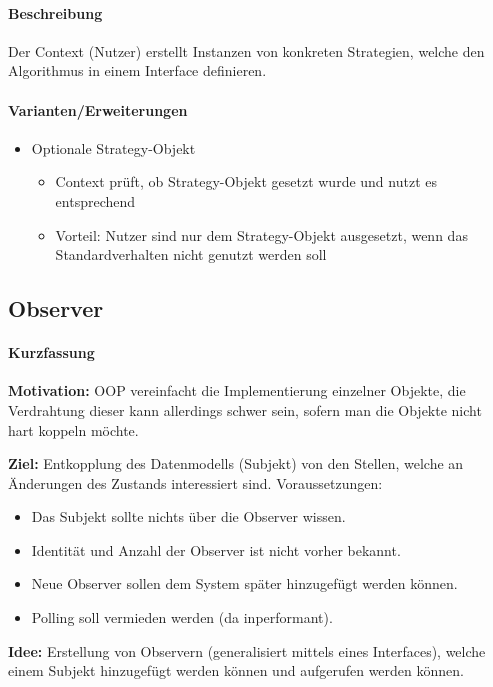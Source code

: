 \documentclass[a4paper, 11pt, accentcolor = tud3b]{tudreport}
\begin{document}
				\paragraph{Beschreibung}
					Der Context (Nutzer) erstellt Instanzen von konkreten Strategien, welche den Algorithmus in einem Interface definieren.
				
				\paragraph{Varianten/Erweiterungen}
					\begin{itemize}
						\item Optionale Strategy-Objekt
							\begin{itemize}
								\item Context prüft, ob Strategy-Objekt gesetzt wurde und nutzt es entsprechend
								\item Vorteil: Nutzer sind nur dem Strategy-Objekt ausgesetzt, wenn das Standardverhalten nicht genutzt werden soll
							\end{itemize}
					\end{itemize}
			
			\subsection{Observer}
				\paragraph{Kurzfassung}
					\textbf{Motivation:} OOP vereinfacht die Implementierung einzelner Objekte, die Verdrahtung dieser kann allerdings schwer sein, sofern man die Objekte nicht hart koppeln möchte.
					
					\textbf{Ziel:} Entkopplung des Datenmodells (Subjekt) von den Stellen, welche an Änderungen des Zustands interessiert sind. Voraussetzungen:
					\begin{itemize}
						\item Das Subjekt sollte nichts über die Observer wissen.
						\item Identität und Anzahl der Observer ist nicht vorher bekannt.
						\item Neue Observer sollen dem System später hinzugefügt werden können.
						\item Polling soll vermieden werden (da inperformant).
					\end{itemize}
					
					\textbf{Idee:} Erstellung von Observern (generalisiert mittels eines Interfaces), welche einem Subjekt hinzugefügt werden können und aufgerufen werden können.
					
\end{document}
